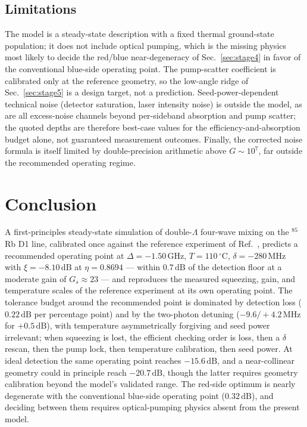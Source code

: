 \documentclass[11pt,a4paper]{article}
\newcommand{\dB}{\,\mathrm{dB}}
\newcommand{\GHz}{\,\mathrm{GHz}}
\newcommand{\MHz}{\,\mathrm{MHz}}
\newcommand{\degC}{\,^{\circ}\mathrm{C}}
\newcommand{\Rb}{$^{85}$Rb}
\begin{document}
\subsection{Limitations}
The model is a steady-state description with a fixed thermal ground-state
population; it does not include optical pumping, which is the missing
physics most likely to decide the red/blue near-degeneracy of
Sec.~\ref{sec:stage4} in favor of the conventional blue-side operating
point. The pump-scatter coefficient is calibrated only at the reference
geometry, so the low-angle ridge of Sec.~\ref{sec:stage5} is a design
target, not a prediction. Seed-power-dependent technical noise (detector
saturation, laser intensity noise) is outside the model, as are all
excess-noise channels beyond per-sideband absorption and pump scatter; the
quoted depths are therefore best-case values for the
efficiency-and-absorption budget alone, not guaranteed measurement
outcomes. Finally, the corrected noise
formula is itself limited by double-precision arithmetic above
$G\sim 10^{7}$, far outside the recommended operating regime.

\section{Conclusion}
A first-principles steady-state simulation of double-$\Lambda$ four-wave
mixing on the \Rb{} D1 line, calibrated once against the reference
experiment of Ref.~\cite{Sim2025}, predicts a recommended operating point at
$\Delta=-1.50\GHz$, $T=110\degC$, $\delta=-280\MHz$ with
$\xi=-8.10\dB$ at $\eta=0.8694$ --- within $0.7\dB$ of the detection floor
at a moderate gain of $G_s\approx 23$ --- and reproduces the measured
squeezing, gain, and temperature scales of the reference experiment at its
own operating point. The tolerance budget around the recommended point is
dominated by detection loss ($0.22\dB$ per percentage point) and by the
two-photon detuning ($-9.6/{+}4.2\MHz$ for $+0.5\dB$), with temperature
asymmetrically forgiving and seed power irrelevant; when squeezing is lost,
the efficient checking order is loss, then a $\delta$ rescan, then the pump
lock, then temperature calibration, then seed power. At ideal detection the
same operating point reaches $-15.6\dB$, and a near-collinear geometry
could in principle reach $-20.7\dB$, though the latter requires geometry
calibration beyond the model's validated range. The red-side optimum is
nearly degenerate with the conventional blue-side operating point
($0.32\dB$), and deciding between them requires optical-pumping physics
absent from the present model.
\end{document}
